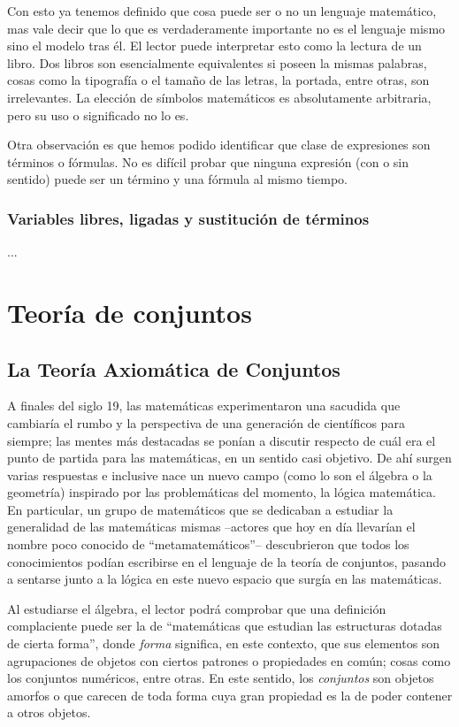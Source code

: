\documentclass[11pt,a4paper]{book}
\begin{document}
Con esto ya tenemos definido que cosa puede ser o no un lenguaje matemático, mas vale decir que lo que es verdaderamente importante no es el lenguaje mismo sino el modelo tras él. El lector puede interpretar esto como la lectura de un libro. Dos libros son esencialmente equivalentes si poseen la mismas palabras, cosas como la tipografía o el tamaño de las letras, la portada, entre otras, son irrelevantes. La elección de símbolos matemáticos es absolutamente arbitraria, pero su uso o significado no lo es.

Otra observación es que hemos podido identificar que clase de expresiones son términos o fórmulas. No es difícil probar que ninguna expresión (con o sin sentido) puede ser un término y una fórmula al mismo tiempo.

\section{Variables libres, ligadas y sustitución de términos}
...

\part{Teoría de conjuntos}
\chapter{La Teoría Axiomática de Conjuntos}
A finales del siglo 19, las matemáticas experimentaron una sacudida que cambiaría el rumbo y la perspectiva de una generación de científicos para siempre; las mentes más destacadas se ponían a discutir respecto de cuál era el punto de partida para las matemáticas, en un sentido casi objetivo. De ahí surgen varias respuestas e inclusive nace un nuevo campo (como lo son el álgebra o la geometría) inspirado por las problemáticas del momento, la lógica matemática. En particular, un grupo de matemáticos que se dedicaban a estudiar la generalidad de las matemáticas mismas --actores que hoy en día llevarían el nombre poco conocido de ``metamatemáticos''-- descubrieron que todos los conocimientos podían escribirse en el lenguaje de la teoría de conjuntos, pasando a sentarse junto a la lógica en este nuevo espacio que surgía en las matemáticas.

Al estudiarse el álgebra, el lector podrá comprobar que una definición complaciente puede ser la de ``matemáticas que estudian las estructuras dotadas de cierta forma'', donde \textit{forma} significa, en este contexto, que sus elementos son agrupaciones de objetos con ciertos patrones o propiedades en común; cosas como los conjuntos numéricos, entre otras. En este sentido, los \textit{conjuntos} son objetos amorfos o que carecen de toda forma cuya gran propiedad es la de poder contener a otros objetos.
\end{document}
